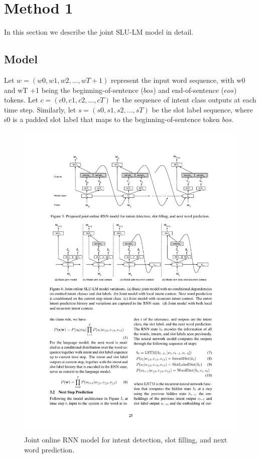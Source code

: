 \section{Method 1}
In this section we describe the joint SLU-LM model in detail. 
\subsection{Model}
Let $w = (w0, w1, w2, ..., wT+1)$ represent the input word sequence, with w0 and wT +1
being the beginning-of-sentence ($bos$) and end-of-sentence ($eos$) tokens. Let $c =
(c0, c1, c2, ..., cT )$ be the sequence of intent class
outputs at each time step. Similarly, let $s =
(s0, s1, s2, ..., sT )$ be the slot label sequence,
where s0 is a padded slot label that maps to the
beginning-of-sentence token $bos$.
\par
\begin{figure}
	\centering
	\includegraphics[width=\textwidth]{fig/jslu-mod}
	\caption{Joint online RNN model for intent detection, slot filling, and next word prediction.}
\end{figure}
